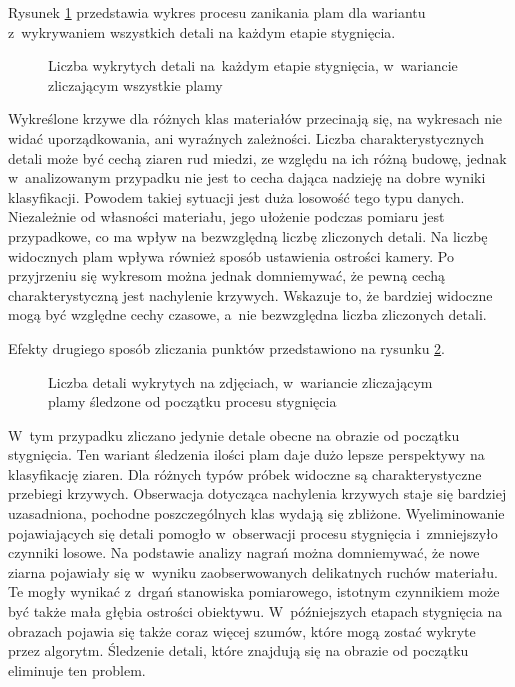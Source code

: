 Rysunek \ref{fig:blobchartall} przedstawia wykres procesu zanikania plam dla
wariantu z~wykrywaniem wszystkich detali na każdym etapie stygnięcia.
\begin{figure}[htb]
    \centering
    
    \caption{Liczba wykrytych detali na~każdym etapie stygnięcia, w~wariancie
             zliczającym wszystkie plamy}
    \label{fig:blobchartall}
\end{figure}
Wykreślone krzywe dla różnych klas materiałów przecinają się, na wykresach
nie widać uporządkowania, ani wyraźnych zależności. 
Liczba charakterystycznych detali może być cechą ziaren rud miedzi, ze
względu na ich różną budowę, jednak w~analizowanym przypadku nie jest to
cecha dająca nadzieję na dobre wyniki klasyfikacji.
Powodem takiej sytuacji jest duża losowość tego typu danych.
Niezależnie od własności materiału, jego ułożenie podczas pomiaru jest
przypadkowe, co ma wpływ na bezwzględną liczbę zliczonych detali.
Na liczbę widocznych plam wpływa również sposób ustawienia ostrości kamery.
Po przyjrzeniu się wykresom można jednak domniemywać, że pewną cechą
charakterystyczną jest nachylenie krzywych.
Wskazuje to, że bardziej widoczne mogą być względne cechy czasowe, a~nie
bezwzględna liczba zliczonych detali.

Efekty drugiego sposób zliczania punktów przedstawiono na rysunku
\ref{fig:blobchartrem}.
\begin{figure}[htb]
    \centering
    
    \caption{Liczba detali wykrytych na zdjęciach, w~wariancie zliczającym
             plamy śledzone od początku procesu stygnięcia}
    \label{fig:blobchartrem}
\end{figure}
W~tym przypadku zliczano jedynie detale obecne na obrazie od początku
stygnięcia.
Ten wariant śledzenia ilości plam daje dużo lepsze perspektywy na klasyfikację
ziaren.
Dla różnych typów próbek widoczne są charakterystyczne przebiegi krzywych.
Obserwacja dotycząca nachylenia krzywych staje się bardziej uzasadniona,
pochodne poszczególnych klas wydają się zbliżone.
Wyeliminowanie pojawiających się detali pomogło w~obserwacji procesu
stygnięcia i~zmniejszyło czynniki losowe.
Na podstawie analizy nagrań można domniemywać, że nowe ziarna pojawiały
się w~wyniku zaobserwowanych delikatnych ruchów materiału.
Te mogły wynikać z~drgań stanowiska pomiarowego, istotnym czynnikiem może
być także mała głębia ostrości obiektywu.
W~późniejszych etapach stygnięcia na obrazach pojawia się także coraz więcej
szumów, które mogą zostać wykryte przez algorytm.
Śledzenie detali, które znajdują się na obrazie od początku eliminuje ten
problem.

